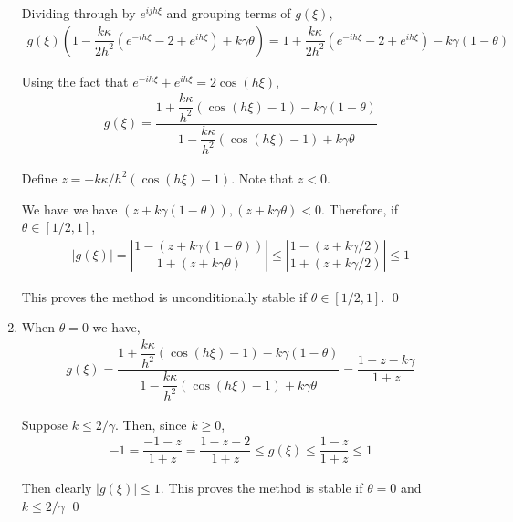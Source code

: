 \documentclass[10pt]{article}
\begin{document}
\begin{solution}[Solution]
\begin{enumerate}[label=(\alph*)]
    Dividing through by \( e^{ijh\xi} \) and grouping terms of \( g(\xi) \),
    \begin{align*}
        g(\xi) \left(1 -  \dfrac{k\kappa}{2h^2}\left( e^{-ih\xi}-2+e^{ih\xi} \right) + k\gamma \theta  \right) = 1 + \dfrac{k\kappa}{2h^2}\left( e^{-ih\xi}-2+e^{ih\xi} \right) - k\gamma(1-\theta)
    \end{align*}

    Using the fact that \( e^{-ih\xi} + e^{ih\xi} = 2\cos(h\xi) \),
    \begin{align*}
        g(\xi) = \dfrac{1 + \dfrac{k\kappa}{h^2}\left( \cos(h\xi) - 1 \right) - k\gamma(1-\theta)}{1 -  \dfrac{k\kappa}{h^2}\left( \cos(h\xi) - 1 \right) + k\gamma\theta}
    \end{align*}

    Define \( z = - k\kappa / h^2 (\cos(h\xi)-1) \). Note that \( z < 0 \).

    We have we have \( (z+k\gamma(1-\theta)),(z+k\gamma\theta) < 0 \). Therefore, if \(  \theta \in [1/2,1] \),
    \begin{align*}
        |g(\xi)| = \left| \dfrac{1-(z+k\gamma(1-\theta))}{1+(z+k\gamma\theta)} \right|
        \leq \left| \dfrac{1-(z+k\gamma/2)}{1+(z+k\gamma/2)} \right| \leq 1
    \end{align*}

    This proves the method is unconditionally stable if \( \theta \in[1/2,1] \). \qed

    \item
    When \( \theta = 0 \) we have,
    \begin{align*}
        g(\xi) = \dfrac{1 + \dfrac{k\kappa}{h^2}\left( \cos(h\xi) - 1 \right) - k\gamma(1-\theta)}{1 -  \dfrac{k\kappa}{h^2}\left( \cos(h\xi) - 1 \right) + k\gamma\theta}
        = \dfrac{1 - z - k\gamma}{1 + z}
    \end{align*}

    Suppose \( k\leq 2/\gamma \). Then, since \( k \geq 0 \),
    \begin{align*}
        -1 = \dfrac{-1-z}{1+z} = \dfrac{1-z-2}{1+z} \leq g(\xi) \leq \dfrac{1-z}{1+z} \leq 1
    \end{align*}

    Then clearly \( |g(\xi)| \leq 1 \).
    This proves the method is stable if \( \theta = 0 \) and \( k\leq 2/\gamma \) \qed
    \end{enumerate}

\end{solution}
\end{document}
